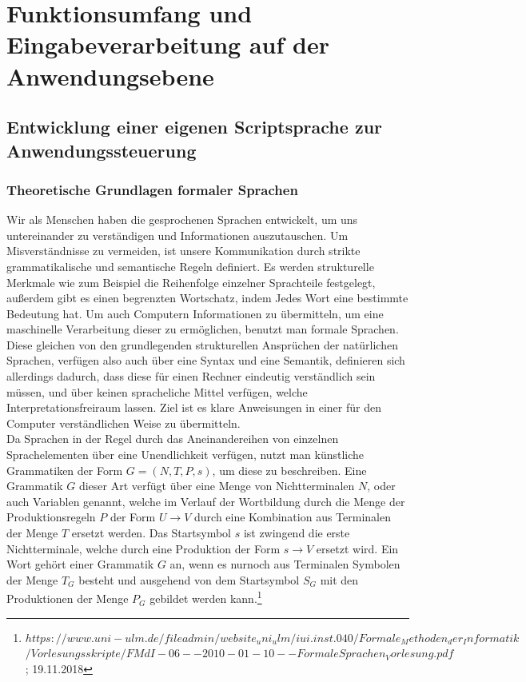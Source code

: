 \documentclass[12pt, a4paper]{scrartcl}
\begin{document}
\section{Funktionsumfang und Eingabeverarbeitung auf der Anwendungsebene}

\subsection{Entwicklung einer eigenen Scriptsprache zur Anwendungssteuerung}
\subsubsection{Theoretische Grundlagen formaler Sprachen}
Wir als Menschen haben die gesprochenen Sprachen entwickelt, um uns untereinander zu verständigen und Informationen auszutauschen. Um Misverständnisse zu vermeiden, ist unsere Kommunikation durch strikte grammatikalische und semantische Regeln definiert. Es werden strukturelle Merkmale wie zum Beispiel die Reihenfolge einzelner Sprachteile festgelegt, außerdem gibt es einen begrenzten Wortschatz, indem Jedes Wort eine bestimmte Bedeutung hat.
Um auch Computern Informationen zu übermitteln, um eine maschinelle Verarbeitung dieser zu ermöglichen, benutzt man formale Sprachen. Diese gleichen von den grundlegenden strukturellen Ansprüchen der natürlichen Sprachen, verfügen also auch über eine Syntax und eine Semantik, definieren sich allerdings dadurch, dass diese für einen Rechner eindeutig verständlich sein müssen, und über keinen spracheliche Mittel verfügen, welche Interpretationsfreiraum lassen. Ziel ist es klare Anweisungen in einer für den Computer verständlichen Weise zu übermitteln.\\
Da Sprachen in der Regel durch das Aneinandereihen von einzelnen Sprachelementen über eine Unendlichkeit verfügen, nutzt man künstliche Grammatiken der Form $G = (N, T, P, s)$, um diese zu beschreiben. Eine Grammatik $G$ dieser Art verfügt über eine Menge von Nichtterminalen $N$, oder auch Variablen genannt, welche im Verlauf der Wortbildung durch die Menge der Produktionsregeln $P$ der Form $U \rightarrow V$ durch eine Kombination aus Terminalen der Menge $T$ ersetzt werden. Das Startsymbol $s$ ist zwingend die erste Nichtterminale, welche durch eine Produktion der Form $s \rightarrow V$ ersetzt wird. Ein Wort gehört einer Grammatik $G$ an, wenn es nurnoch aus Terminalen Symbolen der Menge $T_G$ besteht und ausgehend von dem Startsymbol $S_G$ mit den Produktionen der Menge $P_G$ gebildet werden kann.\footnote{$	https://www.uni-ulm.de/fileadmin/website_uni_ulm/iui.inst.040/Formale_Methoden_der_Informatik$\\$/Vorlesungsskripte/FMdI-06--2010-01-10--FormaleSprachen_Vorlesung.pdf$
; 19.11.2018}\\
\end{document}
